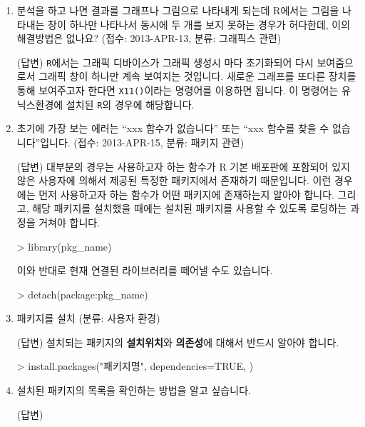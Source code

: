 \documentclass{article}
\begin{document}
\begin{enumerate}
	\item 분석을 하고 나면 결과를 그래프나 그림으로 나타내게 되는데 R에서는 그림을 나타내는 창이 하나만 나타나서 동시에 두 개를 보지 못하는 경우가 허다한데, 이의 해결방법은 없나요? (접수: 2013-APR-13, 분류: 그래픽스 관련) 
	
	\textsf{(답변)} \texttt{R}에서는 그래픽 디바이스가 그래픽 생성시 마다 초기화되어 다시 보여줌으로서 그래픽 창이 하나만 계속 보여지는 것입니다.  새로운 그래프를 또다른 장치를 통해 보여주고자 한다면 \texttt{X11()}이라는 명령어를 이용하면 됩니다.  
	이 명령어는 유닉스환경에 설치된 \texttt{R}의 경우에 해당합니다.  
	
	\item 초기에 가장 보는 에러는 ``xxx 함수가 없습니다'' 또는 ``xxx 함수를 찾을 수 없습니다''입니다. (접수: 2013-APR-15, 분류: 패키지 관련) 
	
	\textsf{(답변)} 대부분의 경우는 사용하고자 하는 함수가 R 기본 배포판에 포함되어 있지 않은 사용자에 의해서 제공된 특정한 패키지에서 존재하기 때문입니다.  	이런 경우에는 먼저 사용하고자 하는 함수가 어떤 패키지에 존재하는지 알아야 합니다.  그리고, 해당 패키지를 설치했을 때에는 설치된 패키지를 사용할 수 있도록 로딩하는 과정을 거쳐야 합니다.

	\begin{Schunk}
	\begin{Soutput}
	> library(pkg_name)	
	\end{Soutput}
	\end{Schunk}
	
	이와 반대로 현재 연결된 라이브러리를 떼어낼 수도 있습니다. 

	\begin{Schunk}
	\begin{Soutput}
	> detach(package:pkg_name)	
	\end{Soutput}
	\end{Schunk}


	\item 패키지를 설치 (분류: 사용자 환경)  
	
	\textsf{(답변)} 설치되는 패키지의 \textbf{설치위치}와 \textbf{의존성}에 대해서 반드시 알아야 합니다. 
	
	\begin{Schunk}
	\begin{Soutput}
	> install.packages("패키지명", dependencies=TRUE, )
	\end{Soutput}
	\end{Schunk}

	\item 설치된 패키지의 목록을 확인하는 방법을 알고 싶습니다.
	
	\textsf{(답변)} 

\end{enumerate}
\end{document}
